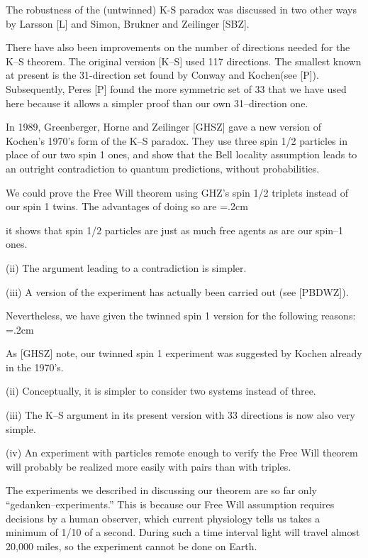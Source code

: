 \documentclass[12pt]{amsart}
\begin{document}
The robustness of the (untwinned) K-S paradox was discussed in two other 
ways by Larsson [L] and Simon, Brukner and Zeilinger [SBZ].    

There have also been improvements on the number of directions needed for
the K--S theorem.  The original version [K--S] used 117 directions.  The 
smallest known at present is the 31-direction set found by Conway and Kochen(see [P]).
Subsequently, Peres [P] found the more symmetric set of 33 that we have used 
here because it allows a simpler proof than our own 31--direction one.

In 1989, Greenberger, Horne and Zeilinger [GHSZ] gave a new version of 
Kochen's 1970's form of the K--S paradox.  They use three spin 1/2 particles in 
place of our two spin 1 ones,  and show that the Bell locality assumption 
leads to an outright contradiction to quantum predictions, without probabilities.

We could prove the Free Will theorem using GHZ's spin 1/2 triplets instead of
our spin 1 twins.  The advantages of doing so are
=.2cm
\begin{list}{(i)}{}
\item it shows that spin 1/2 particles are just as much free agents as are 
our spin--1 ones.
\item[(ii)] The argument leading to a contradiction is simpler.
\item[{(iii)}] A version of the experiment has actually been carried out (see [PBDWZ]).
\end{list}

Nevertheless, we have given the twinned spin 1 version for the 
following reasons:
=.2cm
\begin{list}{(i)}{}
\item As [GHSZ] note, our twinned spin 1
experiment was suggested by Kochen already in the 1970's.
\item[(ii)]  Conceptually, it is simpler to consider two
systems instead of three.
\item[{(iii)}]  The K--S argument in its present version with 33
directions is now also very simple.
\item[{(iv)}]  An experiment with particles remote enough to verify the Free
Will theorem will probably be realized more easily with pairs than with triples.
\end{list}

The  experiments we described in discussing our theorem are so far only
``gedanken--experiments.''  This is because our Free Will assumption
requires decisions by a human observer, which current physiology tells
us takes a minimum of 1/10 of a second.  During such a time interval
light will travel almost 20,000 miles, so the experiment cannot be done
on Earth.
\end{document}

